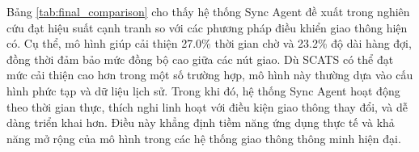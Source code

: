 Bảng \ref{tab:final_comparison} cho thấy hệ thống Sync Agent đề xuất trong nghiên cứu đạt hiệu suất cạnh tranh so với các phương pháp điều khiển giao thông hiện có. Cụ thể, mô hình giúp cải thiện 27.0\% thời gian chờ và 23.2\% độ dài hàng đợi, đồng thời đảm bảo mức đồng bộ cao giữa các nút giao. Dù SCATS có thể đạt mức cải thiện cao hơn trong một số trường hợp, mô hình này thường dựa vào cấu hình phức tạp và dữ liệu lịch sử. Trong khi đó, hệ thống Sync Agent hoạt động theo thời gian thực, thích nghi linh hoạt với điều kiện giao thông thay đổi, và dễ dàng triển khai hơn. Điều này khẳng định tiềm năng ứng dụng thực tế và khả năng mở rộng của mô hình trong các hệ thống giao thông thông minh hiện đại.